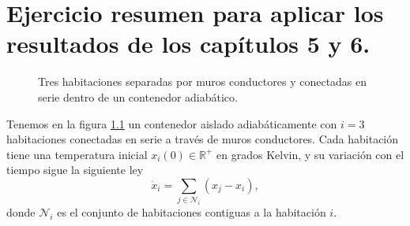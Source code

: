 \chapter{Ejercicio resumen para aplicar los resultados de los capítulos 5 y 6.}

\begin{figure}[h]
\centering
{}
	\caption{Tres habitaciones separadas por muros conductores y conectadas en serie dentro de un contenedor adiabático.}
	\label{fig: adiabatico}
\end{figure}

Tenemos en la figura \ref{fig: adiabatico} un contenedor aislado adiabáticamente con $i=3$ habitaciones conectadas en serie a través de muros conductores. Cada habitación tiene una temperatura inicial $x_i(0)\in\mathbb{R}^+$ en grados Kelvin, y su variación con el tiempo sigue la siguiente ley
\begin{equation}
	\dot x_i = \sum_{j\in\mathcal{N}_i}(x_j - x_i), \label{eq: temp}
\end{equation}
donde $\mathcal{N}_i$ es el conjunto de habitaciones contiguas a la habitación $i$.

